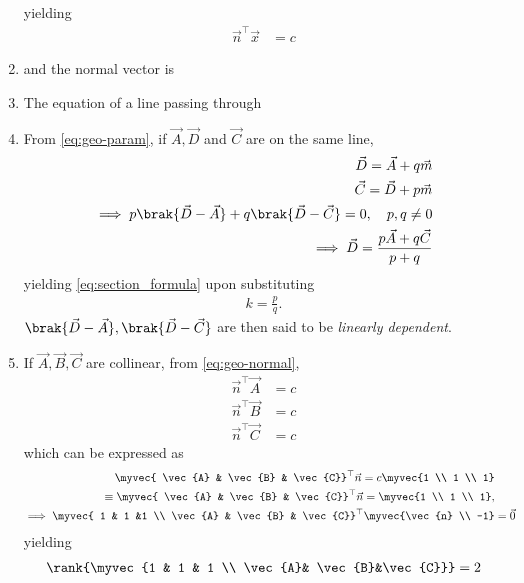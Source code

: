 \begin{enumerate}[label=\thesubsection.\arabic*.,ref=\thesubsection.\theenumi]
			yielding 
\begin{align}
	\label{eq:geo-normal}
\vec{n}^{\top}\vec{x} &= c
\end{align}
		\item 
and the normal vector is
\item The equation of a line passing through 
  \item From \eqref{eq:geo-param}, 
	  if $\vec{A},\vec{D}$ and $\vec{C}$ are on the same line,
		\label{prop:lin-dep}
\begin{align}
			\vec{D}=\vec{A}+q\vec{m} 
			\\ 
			\vec{C}=\vec{D}+p\vec{m} \\
			\label{eq:collinear} 
			\implies 	p\brak{\vec{D}-\vec{A}} 
			+ q\brak{\vec{D}-\vec{C}} = 0, \quad p, q \ne 0 \\ 
			\implies \vec{D} = \frac{p\vec{A}+q\vec{C}}{p+q} 
			\end{align} 
			yielding \eqref{eq:section_formula} upon substituting \begin{align} k = \frac{p}{q}. \end{align} 
			$\brak{\vec{D}-\vec{A}}, \brak{\vec{D}-\vec{C}}$ 
		are then said to be {\em linearly dependent}.
			  \fi
	\item If $\vec{A}, \vec{B}, \vec{C}$ are collinear,  from \eqref{eq:geo-normal}, \begin{align}
	 \vec{n}^{\top}\vec{A} &=  c 
	 \\
	 \vec{n}^{\top}\vec{B} &=  c 
	 \\
	 \vec{n}^{\top}\vec{C} &=  c 
\end{align}
which can be expressed as 
\begin{align}
		\label{prop:lin-eq}
	\myvec{ \vec{A} & \vec{B} & \vec{C}}^{\top}\vec{n} = c\myvec{1 \\ 1 \\ 1}
	\\
	\equiv \myvec{ \vec{A} & \vec{B} & \vec{C}}^{\top}\vec{n} = \myvec{1 \\ 1 \\ 1}
		\label{prop:lin-eq-unit-mat},
	\\
	\implies 
	\myvec{ 1 & 1 &1 \\ \vec{A} & \vec{B} & \vec{C}}^{\top}\myvec{\vec{n} \\ -1} &= \vec{0}
		\label{prop:lin-dep-rank}
\end{align}
\iffalse
yielding
		\begin{align}
			\label{eq:line-rank}
			\rank{\myvec{1 & 1 & 1 \\ \vec{A}& \vec{B}&\vec{C}}} = 2

\end{align}
\end{enumerate}
